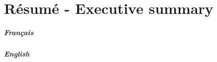 \documentclass[12pt,fleqn]{book} %
\begin{document}
\part{Résumé - Executive summary}
\subsubsection{Français}

\subsubsection{English}




\pagestyle{empty} %

\tableofcontents %

\pagestyle{fancy}
\end{document}

